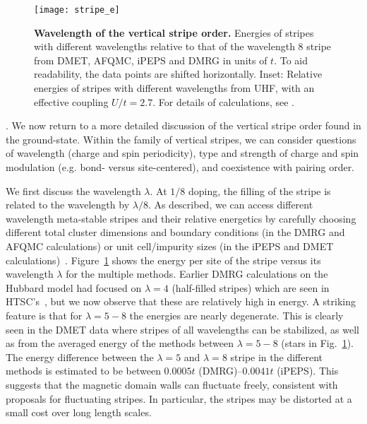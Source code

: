 \documentclass[12pt]{article}
\begin{document}
\begin{figure}[htpb]
  \centering
  \texttt{[image: stripe\_e]}
  \caption{{\bf Wavelength of the vertical stripe order.} Energies of stripes with different wavelengths relative to that of the wavelength 8 stripe from DMET, AFQMC, iPEPS and DMRG in units of $t$. To aid readability, the data points are shifted horizontally. Inset: Relative energies of stripes with different wavelengths from UHF, with an effective coupling $U/t=2.7$. For details of calculations, see \cite{supplementary}.}
  \label{fig:energy_wavelength}
\end{figure}

. We now return to a more detailed discussion of the
vertical stripe order found in the ground-state. Within the family of vertical stripes, 
we can consider questions of wavelength (charge and spin periodicity), type and strength of charge and spin modulation
(e.g. bond- versus site-centered), and coexistence with pairing order.

We first discuss the wavelength $\lambda$. At $1/8$ doping, the filling of the stripe is related to the wavelength by $\lambda/8$. %
As described, we can access different wavelength meta-stable stripes and their relative energetics by 
carefully choosing different total cluster dimensions and boundary conditions (in the DMRG and AFQMC calculations) or unit cell/impurity sizes (in the iPEPS and DMET calculations)~\cite{supplementary}. 
Figure~\ref{fig:energy_wavelength} shows the energy per site of the stripe versus its wavelength $\lambda$ for the multiple
methods. Earlier DMRG calculations on the Hubbard model had focused on $\lambda=4$ (half-filled stripes) which are seen in HTSC's~\cite{white1998density,white2003stripes},
  but we now observe that these are relatively high in energy. A striking feature is that
for $\lambda= 5-8$ the energies are nearly degenerate. This is clearly seen in the DMET data 
where stripes of all wavelengths can be stabilized, as well as from the averaged energy of the methods
between $\lambda=5-8$ (stars in Fig.~\ref{fig:energy_wavelength}). 
The energy difference between the $\lambda=5$ and $\lambda=8$ stripe in the different methods is estimated to be between $0.0005t$ (DMRG)--$0.0041t$ (iPEPS). 
This suggests that the magnetic domain walls can fluctuate freely, consistent with proposals for fluctuating stripes. 
In particular, the stripes may be distorted at a small cost over long length scales. 
\end{document}
